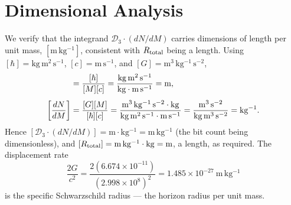 \documentclass[aps,prd,twocolumn,showpacs,preprintnumbers,amsmath,amssymb,longbibliography]{revtex4-2}
\begin{document}
\section{Dimensional Analysis}
\label{app:dimensional}

We verify that the integrand $\mathcal{D}_3\cdot(dN/dM)$ carries dimensions of
length per unit mass, $[\mathrm{m\,kg^{-1}}]$, consistent with $R_{\rm total}$
being a length. Using $[\hbar]=\mathrm{kg\,m^2\,s^{-1}}$, $[c]=\mathrm{m\,s^{-1}}$,
and $[G]=\mathrm{m^3\,kg^{-1}\,s^{-2}}$,
\begin{align}
[\mathcal{D}_3] &= \frac{[\hbar]}{[M][c]}
= \frac{\mathrm{kg\,m^2\,s^{-1}}}{\mathrm{kg}\cdot\mathrm{m\,s^{-1}}}
= \mathrm{m}, \notag\\[4pt]
\left[\frac{dN}{dM}\right] &= \frac{[G][M]}{[\hbar][c]}
= \frac{\mathrm{m^3\,kg^{-1}\,s^{-2}}\cdot\mathrm{kg}}
       {\mathrm{kg\,m^2\,s^{-1}}\cdot\mathrm{m\,s^{-1}}}
= \frac{\mathrm{m^3\,s^{-2}}}{\mathrm{kg\,m^3\,s^{-2}}}
= \mathrm{kg^{-1}}. \notag
\end{align}
Hence $[\mathcal{D}_3\cdot(dN/dM)]=\mathrm{m}\cdot\mathrm{kg^{-1}}=\mathrm{m\,kg^{-1}}$
(the bit count being dimensionless), and
$[R_{\rm total}]=\mathrm{m\,kg^{-1}}\cdot\mathrm{kg}=\mathrm{m}$, a length, as
required. The displacement rate
\begin{equation}
\frac{2G}{c^2}=\frac{2(6.674\times10^{-11})}{(2.998\times10^8)^2}
=1.485\times10^{-27}\ \mathrm{m\,kg^{-1}}
\end{equation}
is the specific Schwarzschild radius --- the horizon radius per unit mass.
\end{document}
